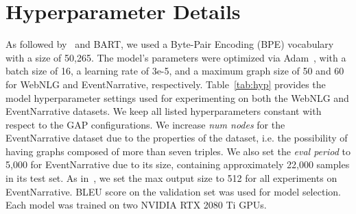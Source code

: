 \documentclass[11pt]{article}
\begin{document}


\newpage
\appendix


\section{Hyperparameter Details}
\label{sec:hyp}
As followed by~\citet{ke-etal-2021-jointgt} and BART, we used a Byte-Pair Encoding (BPE) vocabulary~\cite{radford2019language} with a size of 50,265. 
The model's parameters were optimized via Adam~\cite{Kingma2015AdamAM}, with a batch size of 16, a learning rate of 3e-5, and a maximum graph size of 50 and 60 for WebNLG and EventNarrative, respectively. 
Table~\ref{tab:hyp} provides the model hyperparameter settings used for experimenting on both the WebNLG and EventNarrative datasets. We keep all listed hyperparameters constant with respect to the GAP configurations. We increase \textit{num nodes} for the EventNarrative dataset due to the properties of the dataset, i.e. the possibility of having graphs composed of more than seven triples. We also set the \textit{eval period} to 5,000 for EventNarrative due to its size, containing approximately 22,000 samples in its test set. As in~\cite{colas2021eventnarrative}, we set the max output size to 512 for all experiments on EventNarrative. BLEU score on the validation set was used for model selection. Each model was trained on two NVIDIA RTX 2080 Ti GPUs.

\begin{table}[H]
\centering
{}
\caption{\label{tab:hyp} Hyperparameters for GAP on both the WebNLG and EventNarrative datasets.}
\end{table}
\end{document}
